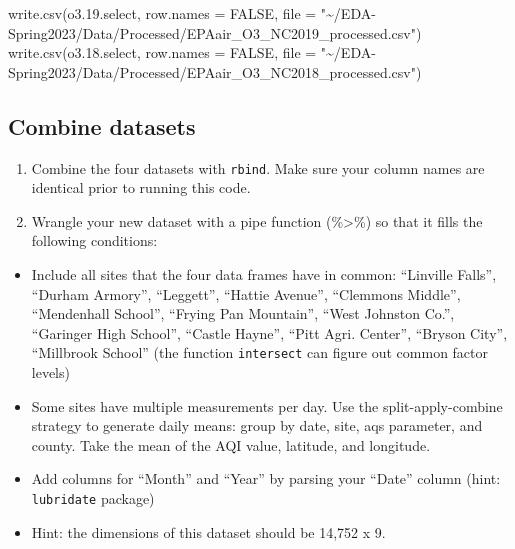 \documentclass[
]{article}
\newenvironment{Shaded}{\begin{snugshade}}{\end{snugshade}}
\newcommand{\AttributeTok}[1]{\textcolor[rgb]{0.77,0.63,0.00}{#1}}
\newcommand{\ConstantTok}[1]{\textcolor[rgb]{0.00,0.00,0.00}{#1}}
\newcommand{\FloatTok}[1]{\textcolor[rgb]{0.00,0.00,0.81}{#1}}
\newcommand{\FunctionTok}[1]{\textcolor[rgb]{0.00,0.00,0.00}{#1}}
\newcommand{\NormalTok}[1]{#1}
\newcommand{\StringTok}[1]{\textcolor[rgb]{0.31,0.60,0.02}{#1}}
\providecommand{\tightlist}{%
  \setlength{\itemsep}{0pt}\setlength{\parskip}{0pt}}
\begin{document}
\begin{Shaded}
\begin{Highlighting}[]
\FunctionTok{write.csv}\NormalTok{(o3.}\FloatTok{19.}\NormalTok{select, }\AttributeTok{row.names =} \ConstantTok{FALSE}\NormalTok{, }\AttributeTok{file =} \StringTok{"\textasciitilde{}/EDA{-}Spring2023/Data/Processed/EPAair\_O3\_NC2019\_processed.csv"}\NormalTok{)}
\FunctionTok{write.csv}\NormalTok{(o3.}\FloatTok{18.}\NormalTok{select, }\AttributeTok{row.names =} \ConstantTok{FALSE}\NormalTok{, }\AttributeTok{file =} \StringTok{"\textasciitilde{}/EDA{-}Spring2023/Data/Processed/EPAair\_O3\_NC2018\_processed.csv"}\NormalTok{)}
\end{Highlighting}
\end{Shaded}

\hypertarget{combine-datasets}{%
\subsection{Combine datasets}\label{combine-datasets}}

\begin{enumerate}
\def\labelenumi{\arabic{enumi}.}
\setcounter{enumi}{6}
\tightlist
\item
  Combine the four datasets with \texttt{rbind}. Make sure your column
  names are identical prior to running this code.
\item
  Wrangle your new dataset with a pipe function (\%\textgreater\%) so
  that it fills the following conditions:
\end{enumerate}

\begin{itemize}
\tightlist
\item
  Include all sites that the four data frames have in common: ``Linville
  Falls'', ``Durham Armory'', ``Leggett'', ``Hattie Avenue'', ``Clemmons
  Middle'', ``Mendenhall School'', ``Frying Pan Mountain'', ``West
  Johnston Co.'', ``Garinger High School'', ``Castle Hayne'', ``Pitt
  Agri. Center'', ``Bryson City'', ``Millbrook School'' (the function
  \texttt{intersect} can figure out common factor levels)
\item
  Some sites have multiple measurements per day. Use the
  split-apply-combine strategy to generate daily means: group by date,
  site, aqs parameter, and county. Take the mean of the AQI value,
  latitude, and longitude.
\item
  Add columns for ``Month'' and ``Year'' by parsing your ``Date'' column
  (hint: \texttt{lubridate} package)
\item
  Hint: the dimensions of this dataset should be 14,752 x 9.
\end{itemize}
\end{document}
